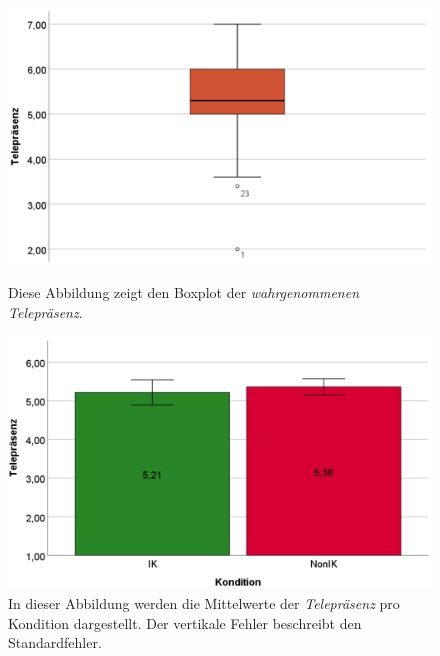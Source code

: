 \documentclass[a4paper,11pt]{article}%
\renewcommand{\\}{\vspace*{0.5\baselineskip} \newline}
\begin{document}
{{{{{{{{{{{{{{{{{{{{	\begin{figure}[H]
   \begin{minipage}[t]{.5\linewidth} %
      \includegraphics[width=\linewidth]{Abbildungen/AuswertungDiagramme/Final/BP_Telepresence.png}
      \caption[Boxplot der wahrgenommenen Telepräsenz]{Diese Abbildung zeigt den Boxplot der \textit{wahrgenommenen Telepräsenz}.}
            \label{SD_Telepresence}
   \end{minipage}
   \hspace{.02\linewidth}%
   \begin{minipage}[t]{.5\linewidth} %
     \includegraphics[width=\linewidth]{Abbildungen/AuswertungDiagramme/Final/SD_Telepresence_Mittelwerte.png}
      \caption[Durchschnittlich wahrgenommene Telepräsenz]{In dieser Abbildung werden die Mittelwerte der \textit{Telepräsenz} pro Kondition dargestellt. Der vertikale Fehler beschreibt den Standardfehler.}
       \label{SD_Telepresence_Mittelwerte}
   \end{minipage}
\end{figure}


}}}}}}}}}}}}}}}}}}}}
\end{document}

